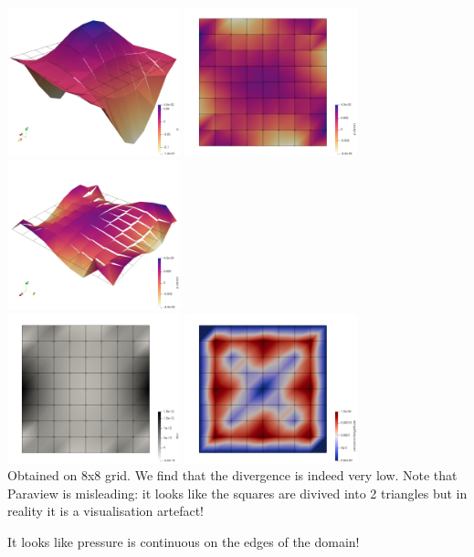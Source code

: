 \begin{center}
\includegraphics[width=5cm]{python_codes/fieldstone_161/results/bench2/press}
\includegraphics[width=5cm]{python_codes/fieldstone_161/results/bench2/press_error}
\includegraphics[width=5cm]{python_codes/fieldstone_161/results/bench2/press_error2}\\
\includegraphics[width=5cm]{python_codes/fieldstone_161/results/bench2/divv}
\includegraphics[width=5cm]{python_codes/fieldstone_161/results/bench2/vel_error}\\
{\captionfont Obtained on 8x8 grid. We find that the divergence is indeed very low.
Note that Paraview is misleading: it looks like the squares are divived into 2 triangles but
in reality it is a visualisation artefact!}
\end{center}
It looks like pressure is continuous on the edges of the domain!

